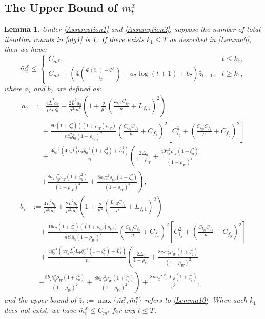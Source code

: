\documentclass{article}
\theoremstyle{plain}
\newtheorem{lemma}[lemma]{Lemma}
\theoremstyle{definition}
\theoremstyle{remark}
\begin{document}
\subsection{The Upper Bound of $\bar{m}^x_t$}
\begin{lemma}\label{Lemma13} Under \cref{Assumption1} and \cref{Assumption2}, suppose the number of total iteration rounds in \cref{alg1} is $T$. If there exists $k_1 \leq T$ as described in \cref{Lemma6}, then we have:
\begin{equation}
\bar{m}^x_t \leq
\begin{cases}
C_{m^x}, & t \leq k_1, \\
C_{m^x} + {\left(4\left(\frac{\Phi(\bar{x}_{0})-\Phi^*}{\gamma_x}\right)+a_7\log(t+1)+b_7\right)\bar{z}_{t+1}}, & t \geq k_1,
\end{cases}\label{eq126}
\end{equation}
where $a_7$ and $b_7$ are defined as:
\begin{align}
  a_7 &:=  \frac{4\bar{L}^2a_6 }{\mu^2\bar{m}^x_{0}}+\frac{2\bar{L}^2a_5}{\mu^2\bar{m}^x_{0}} \left( 1 + \frac{2}{\mu^2} \left( \frac{L_{l,2} C_{f_y}}{\mu} + L_{f,1} \right)^2 \right) \nonumber\\
  &\quad+ \frac{80(1+\zeta_q^2)((1 + \rho_W) \rho_W)}{n\bar{z}_0^2\bar{q}_0(1 - \rho_W)^2}\left(\frac{C_{l_{xy}}C_{f_y}}{\mu}+C_{f_x}\right)^2\left[C_{l_y}^2+\left(\frac{C_{l_{yy}}C_{f_y}}{\mu}+C_{f_y}\right)^2\right] \nonumber\\
&\quad+\frac{4\bar{q}_{0}^{-1}(4\gamma_x \bar{L}_{f}^2L_\Phi \bar{q}_0^{-1} \left(1 +\zeta_q^2\right)+\bar{L}_f^2)}{n}\left(\frac{2 \Delta_0}{1 - \rho_W} 
+ \frac{40 \gamma_x^2 \rho_W (1 + \zeta_q^2)}{(1 - \rho_W)^2}\right. \nonumber \\
&\quad \left.+ \frac{8a_2 \gamma_y^2 \rho_W (1 + \zeta_u^2)}{(1 - \rho_W)^2}+\frac{8a_3 \gamma_v^2 \rho_W (1 + \zeta_z^2)}{(1 - \rho_W)^2}\right),\nonumber
\end{align}
\begin{align}
b_7 &:=  \frac{4\bar{L}^2b_6}{\mu^2\bar{m}^x_{0}}+\frac{2\bar{L}^2b_5}{\mu^2\bar{m}^x_{0}} \left( 1 + \frac{2}{\mu^2} \left( \frac{L_{l,2} C_{f_y}}{\mu} + L_{f,1} \right)^2 \right)\nonumber\\
&\quad+ \frac{16c_2(1+\zeta_q^2)((1 + \rho_W) \rho_W)}{n\bar{z}_0^2\bar{q}_0(1 - \rho_W)^2}\left(\frac{C_{l_{xy}}C_{f_y}}{\mu}+C_{f_x}\right)^2\left[C_{l_y}^2+\left(\frac{C_{l_{yy}}C_{f_y}}{\mu}+C_{f_y}\right)^2\right] \nonumber\\
&\quad+\frac{4\bar{q}_{0}^{-1}(4\gamma_x \bar{L}_{f}^2L_\Phi \bar{q}_0^{-1} \left(1 +\zeta_q^2\right)+\bar{L}_f^2)}{n}\left(\frac{2 \Delta_0}{1 - \rho_W} 
+ \frac{8c_2 \gamma_x^2 \rho_W (1 + \zeta_q^2)}{(1 - \rho_W)^2}\right. \nonumber \\
&\quad \left.+ \frac{8b_2 \gamma_y^2 \rho_W (1 + \zeta_u^2)}{(1 - \rho_W)^2}+\frac{8 b_3\gamma_v^2 \rho_W (1 + \zeta_z^2)}{(1 - \rho_W)^2}\right)+ \frac{8n\gamma_x C_{m^x}^2 L_\Phi \left(1 +\zeta_q^2\right)}{\bar{q}_0^2},\label{eq128}
\end{align}
and the upper bound of $\bar{z}_t := \max\{\bar{m}^y_t, \bar{m}^v_t\}$ refers to \cref{Lemma10}. When such $k_1$ does not exist, we have $\bar{m}^x_t \leq C_{m^x}$ for any $t \leq T$.
\end{lemma}
\end{document}
